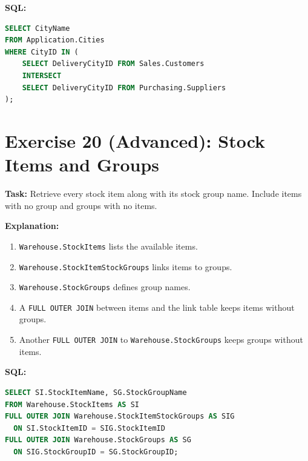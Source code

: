 \documentclass[12pt,a4paper]{article}
\begin{document}
\textbf{SQL:}
\begin{lstlisting}[language=SQL]
SELECT CityName
FROM Application.Cities
WHERE CityID IN (
    SELECT DeliveryCityID FROM Sales.Customers
    INTERSECT
    SELECT DeliveryCityID FROM Purchasing.Suppliers
);
\end{lstlisting}

\section{Exercise 20 (Advanced): Stock Items and Groups}
\textbf{Task:} Retrieve every stock item along with its stock group name. Include items with no group and groups with no items.

\textbf{Explanation:}
\begin{enumerate}
  \item \texttt{Warehouse.StockItems} lists the available items.
  \item \texttt{Warehouse.StockItemStockGroups} links items to groups.
  \item \texttt{Warehouse.StockGroups} defines group names.
  \item A \texttt{FULL OUTER JOIN} between items and the link table keeps items without groups.
  \item Another \texttt{FULL OUTER JOIN} to \texttt{Warehouse.StockGroups} keeps groups without items.
\end{enumerate}

\textbf{SQL:}
\begin{lstlisting}[language=SQL]
SELECT SI.StockItemName, SG.StockGroupName
FROM Warehouse.StockItems AS SI
FULL OUTER JOIN Warehouse.StockItemStockGroups AS SIG
  ON SI.StockItemID = SIG.StockItemID
FULL OUTER JOIN Warehouse.StockGroups AS SG
  ON SIG.StockGroupID = SG.StockGroupID;
\end{lstlisting}
\end{document}
